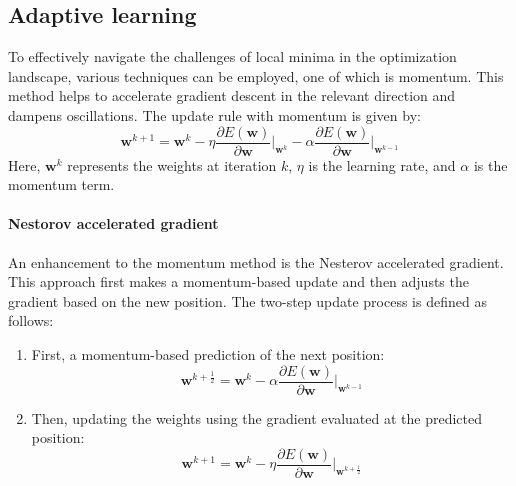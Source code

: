 \subsection{Adaptive learning}
To effectively navigate the challenges of local minima in the optimization landscape, various techniques can be employed, one of which is momentum. 
This method helps to accelerate gradient descent in the relevant direction and dampens oscillations. 
The update rule with momentum is given by:
\[\mathbf{w}^{k+1}=\mathbf{w}^k-\eta\dfrac{\partial E(\mathbf{w})}{\partial \mathbf{w}}\Bigg|_{\mathbf{w}^k}-\alpha\dfrac{\partial E(\mathbf{w})}{\partial \mathbf{w}}\Bigg|_{\mathbf{w}^{k-1}}\]
Here, $\mathbf{w}^k$ represents the weights at iteration $k$, $\eta$ is the learning rate, and $\alpha$ is the momentum term.

\paragraph*{Nestorov accelerated gradient}
An enhancement to the momentum method is the Nesterov accelerated gradient. 
This approach first makes a momentum-based update and then adjusts the gradient based on the new position. 
The two-step update process is defined as follows:
\begin{enumerate}
    \item First, a momentum-based prediction of the next position:
        \[\mathbf{w}^{k+\frac{1}{2}}=\mathbf{w}^k-\alpha\dfrac{\partial E(\mathbf{w})}{\partial \mathbf{w}}\Bigg|_{\mathbf{w}^{k-1}}\]
    \item Then, updating the weights using the gradient evaluated at the predicted position:
        \[\mathbf{w}^{k+1}=\mathbf{w}^k-\eta\dfrac{\partial E(\mathbf{w})}{\partial \mathbf{w}}\Bigg|_{\mathbf{w}^{k+\frac{1}{2}}}\]
\end{enumerate}

